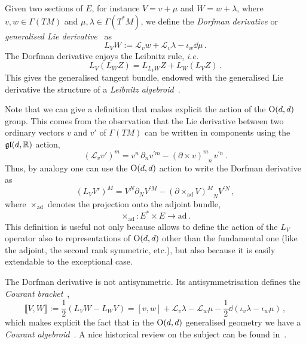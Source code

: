 \documentclass[debug]{phd}
\begin{document}
					Given two sections of $E$, for instance $V = v + \mu$ and $W = w + \lambda$, where $v, w \in \Gamma(TM)$ and $\mu, \lambda \in \Gamma(T^*M)$, we define the \emph{Dorfman derivative} or \emph{generalised Lie derivative}~\cite{hitch1, waldram5, waldram1} as 
							\begin{equation}\label{dorf}
								L_{V} W := \mathcal{L}_v w + \mathcal{L}_v \lambda - \iota_w \dd \mu \, .
							\end{equation}
					The Dorfman derivative enjoys the Leibnitz rule, \emph{i.e.}
							\begin{equation}\label{eq:Leibniz}
								L_V (L_W Z) = L_{L_V W} Z + L_W (L_V Z) \, .
							\end{equation}
					This gives the generalised tangent bundle, endowed with the generalised Lie derivative the structure of a \emph{Leibnitz algebroid}~\cite{baragliaLeib}.
					
					Note that we can give a definition that makes explicit the action of the $\mathrm{O}(d,d)$ group.
					This comes from the observation that the Lie derivative between two ordinary vectors $v$ and $v'$ of $\Gamma(TM)$ can be written in components using the $\mathfrak{gl}(d, \mathbb{R})$ action,
							\begin{equation*}
								( \mathcal{L}_v v')^m = v^n \,\partial_n v^{\prime m} - (\partial \times v)^m_{\phantom{m}n} \,v^{\prime n} \, .
							\end{equation*}
					Thus, by analogy one can use the $\mathrm{O}(d,d)$ action to write the Dorfman derivative as
							\begin{equation}\label{adjDorf}
								\left(L_V V'\right)^M = V^N \partial_N V^{\prime M} - \left(\partial \times_{\mathrm{ad}} V \right)^M_{\phantom{M}N}V^{\prime N} \, ,
							\end{equation}
					where $\times_{\mathrm{ad}}$ denotes the projection onto the adjoint bundle,
							\begin{equation}
								\times_{\mathrm{ad}} : E^* \times E \longrightarrow \mathrm{ad} \, .
							\end{equation}
					This definition is useful not only because allows to define the action of the $L_V$ operator also to representations of $\mathrm{O}(d,d)$ other than the fundamental one (like the adjoint, the second rank symmetric, etc.), but also because it is easily extendable to the exceptional case.
					
					The Dorfman derivative is not antisymmetric.
					Its antisymmetrisation defines the \emph{Courant bracket}~\cite{CourWein, waldram1},
							\begin{equation}\label{cour}
								\llbracket V, W \rrbracket := \frac{1}{2}\left( L_V W - L_W V \right) = \left[v, w\right] + \mathcal{L}_v \lambda - \mathcal{L}_w \mu - \frac{1}{2} \dd (\iota_v \lambda - \iota_w \mu) \, ,
							\end{equation}
					which makes explicit the fact that in the $\mathrm{O}(d,d)$ generalised geometry we have a \emph{Courant algebroid}~\cite{CourWein, courant}.
					A nice historical review on the subject can be found in~\cite{courhist}.
					
\end{document}
